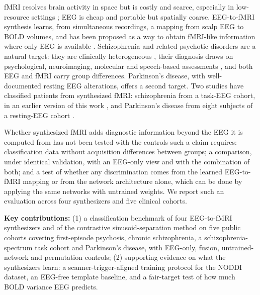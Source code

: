 \documentclass{article}
\begin{document}
fMRI resolves brain activity in space but is costly and scarce, especially in low-resource settings \cite{ogbole2018survey}; EEG is cheap and portable but spatially coarse. EEG-to-fMRI synthesis learns, from simultaneous recordings, a mapping from scalp EEG to BOLD volumes, and has been proposed as a way to obtain fMRI-like information where only EEG is available \cite{liu2019convolutional, liu2020latent, bricman2021eeg2fmri, calhas2022eeg, roos2025brainwaves, he2025spec2vol, lanzino2024ntvit, li2024neurobolt}. Schizophrenia and related psychotic disorders are a natural target: they are clinically heterogeneous \cite{saha2005systematic}, their diagnosis draws on psychological, neuroimaging, molecular and speech-based assessments \cite{andreou2020structural,neale2015genetic,corcoran2020language}, and both EEG \cite{tan2016eeg,aydin2018cortical,roach2008event,bates2009low} and fMRI \cite{oh2020identifying, velakoulis2006hippocampal, haukvik2013schizophrenia} carry group differences. Parkinson's disease, with well-documented resting EEG alterations, offers a second target. Two studies have classified patients from synthesized fMRI: schizophrenia from a task-EEG cohort, in an earlier version of this work \cite{calhas2023medrxiv}, and Parkinson's disease from eight subjects of a resting-EEG cohort \cite{yao2025catd}.

Whether synthesized fMRI adds diagnostic information beyond the EEG it is computed from has not been tested with the controls such a claim requires: classification data without acquisition differences between groups; a comparison, under identical validation, with an EEG-only view and with the combination of both; and a test of whether any discrimination comes from the learned EEG-to-fMRI mapping or from the network architecture alone, which can be done by applying the same networks with untrained weights. We report such an evaluation across four synthesizers and five clinical cohorts.

\textbf{Key contributions:} (1) a classification benchmark of four EEG-to-fMRI synthesizers and of the contrastive sinusoid-separation method \cite{calhas2023medrxiv} on five public cohorts covering first-episode psychosis, chronic schizophrenia, a schizophrenia-spectrum task cohort and Parkinson's disease, with EEG-only, fusion, untrained-network and permutation controls; (2) supporting evidence on what the synthesizers learn: a scanner-trigger-aligned training protocol for the NODDI dataset, an EEG-free template baseline, and a fair-target test of how much BOLD variance EEG predicts.
\end{document}
